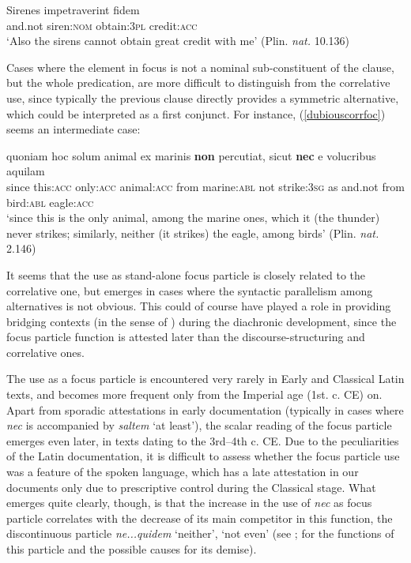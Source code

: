 \documentclass[output=paper,modfonts,nonflat,citecolor=brown,
showindex
]{langsci/langscibook}
\begin{document}
{\begin{exe}
\ex \label{focussirens}  Sirenes impetraverint fidem\\
and.not siren:{\textsc{nom}} obtain:{\textsc{3pl}} credit:{\textsc{acc}}\\

`Also the sirens cannot obtain great credit with me' (Plin. {\emph{nat.}} 10.136)
\end{exe}}

\noindent Cases where the element in focus is not a nominal sub-constituent of the clause, but the whole predication, are more difficult to distinguish from the correlative use, since typically the previous clause directly provides a symmetric alternative, which could be interpreted as a first conjunct. For instance, (\ref{dubiouscorrfoc}) seems an intermediate case:

{\begin{exe}
\ex \label{dubiouscorrfoc} \gll quoniam hoc solum animal ex marinis {\textbf{non}} percutiat, sicut {\textbf{nec}} e volucribus aquilam\\
since this:{\textsc{acc}} only:{\textsc{acc}} animal:{\textsc{acc}} from marine:{\textsc{abl}} not strike:{\textsc{3sg}} as and.not from bird:{\textsc{abl}} eagle:{\textsc{acc}}\\

`since this is the only animal, among the marine ones, which it (the thunder) never strikes; similarly, neither (it strikes) the eagle, among birds' (Plin. {\emph{nat.}} 2.146)
\end{exe}}

\noindent It seems that the use as stand-alone focus particle is closely related to the correlative one, but emerges in cases where the syntactic parallelism among alternatives is not obvious. This could of course have played a role in providing bridging contexts (in the sense of \citealt{Heine02}) during the diachronic development, since the focus particle function is attested later than the discourse-structuring and correlative ones. 

The use as a focus particle is encountered very rarely in Early and Classical Latin texts, and becomes more frequent only from the Imperial age (1st. c. CE) on. Apart from sporadic attestations in early documentation (typically in cases where {\emph{nec}} is accompanied by {\emph{saltem}} `at least'), the scalar reading of the focus particle emerges even later, in texts dating to the 3rd--4th c. CE. Due to the peculiarities of the Latin documentation, it is difficult to assess whether the focus particle use was a feature of the spoken language, which has a late attestation in our documents only due to prescriptive control during the Classical stage. What emerges quite clearly, though, is that the increase in the use of {\emph{nec}} as focus particle correlates with the decrease of its main competitor in this function, the discontinuous particle {\emph{ne...quidem}} `neither', `not even' (see \citealt[chapter 7]{Orlandini01}; \citealt[]{Gianollo17} for the functions of this particle and the possible causes for its demise).
\end{document}
